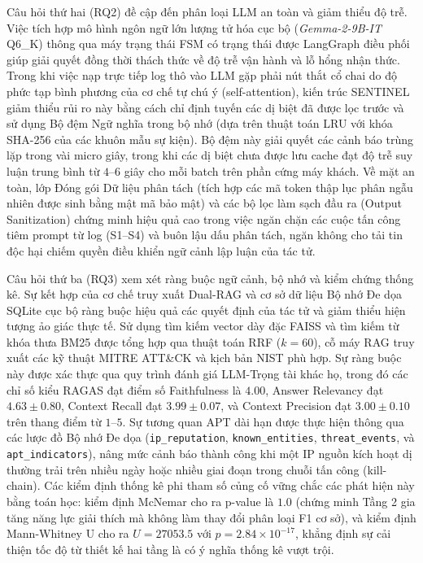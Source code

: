 Câu hỏi thứ hai (RQ2) đề cập đến phân loại LLM an toàn và giảm thiểu độ trễ. Việc tích hợp mô hình ngôn ngữ lớn lượng tử hóa cục bộ (\textit{Gemma-2-9B-IT} Q6\_K) thông qua máy trạng thái FSM có trạng thái được LangGraph điều phối giúp giải quyết đồng thời thách thức về độ trễ vận hành và lỗ hổng nhận thức. Trong khi việc nạp trực tiếp log thô vào LLM gặp phải nút thắt cổ chai do độ phức tạp bình phương của cơ chế tự chú ý (self-attention), kiến trúc SENTINEL giảm thiểu rủi ro này bằng cách chỉ định tuyến các dị biệt đã được lọc trước và sử dụng Bộ đệm Ngữ nghĩa trong bộ nhớ (dựa trên thuật toán LRU với khóa SHA-256 của các khuôn mẫu sự kiện). Bộ đệm này giải quyết các cảnh báo trùng lặp trong vài micro giây, trong khi các dị biệt chưa được lưu cache đạt độ trễ suy luận trung bình từ $4$--$6$ giây cho mỗi batch trên phần cứng máy khách. Về mặt an toàn, lớp Đóng gói Dữ liệu phân tách (tích hợp các mã token thập lục phân ngẫu nhiên được sinh bằng mật mã bảo mật) và các bộ lọc làm sạch đầu ra (Output Sanitization) chứng minh hiệu quả cao trong việc ngăn chặn các cuộc tấn công tiêm prompt từ log (S1--S4) và buôn lậu dấu phân tách, ngăn không cho tải tin độc hại chiếm quyền điều khiển ngữ cảnh lập luận của tác tử.

Câu hỏi thứ ba (RQ3) xem xét ràng buộc ngữ cảnh, bộ nhớ và kiểm chứng thống kê. Sự kết hợp của cơ chế truy xuất Dual-RAG và cơ sở dữ liệu Bộ nhớ Đe dọa SQLite cục bộ ràng buộc hiệu quả các quyết định của tác tử và giảm thiểu hiện tượng ảo giác thực tế. Sử dụng tìm kiếm vector dày đặc FAISS và tìm kiếm từ khóa thưa BM25 được tổng hợp qua thuật toán RRF ($k=60$), cỗ máy RAG truy xuất các kỹ thuật MITRE ATT\&CK và kịch bản NIST phù hợp. Sự ràng buộc này được xác thực qua quy trình đánh giá LLM-Trọng tài khác họ, trong đó các chỉ số kiểu RAGAS đạt điểm số Faithfulness là $4.00$, Answer Relevancy đạt $4.63 \pm 0.80$, Context Recall đạt $3.99 \pm 0.07$, và Context Precision đạt $3.00 \pm 0.10$ trên thang điểm từ $1$--$5$. Sự tương quan APT dài hạn được thực hiện thông qua các lược đồ Bộ nhớ Đe dọa (\texttt{ip\_reputation}, \texttt{known\_entities}, \texttt{threat\_events}, và \texttt{apt\_indicators}), nâng mức cảnh báo thành công khi một IP nguồn kích hoạt dị thường trải trên nhiều ngày hoặc nhiều giai đoạn trong chuỗi tấn công (kill-chain). Các kiểm định thống kê phi tham số củng cố vững chắc các phát hiện này bằng toán học: kiểm định McNemar cho ra p-value là $1.0$ (chứng minh Tầng 2 gia tăng năng lực giải thích mà không làm thay đổi phân loại F1 cơ sở), và kiểm định Mann-Whitney U cho ra $U=27053.5$ với $p = 2.84 \times 10^{-17}$, khẳng định sự cải thiện tốc độ từ thiết kế hai tầng là có ý nghĩa thống kê vượt trội.

